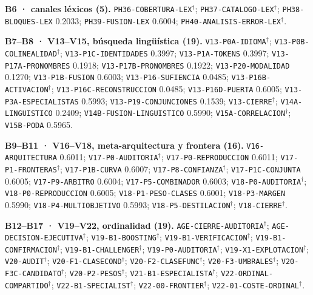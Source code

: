 \documentclass[journal]{IEEEtai}
\begin{document}
\par\medskip\noindent\textbf{B6 · canales l\'exicos (5).} \texttt{PH36-COBERTURA-LEX}$^{\dagger}$; \texttt{PH37-CATALOGO-LEX}$^{\dagger}$; \texttt{PH38-BLOQUES-LEX} 0.2033; \texttt{PH39-FUSION-LEX} 0.6004; \texttt{PH40-ANALISIS-ERROR-LEX}$^{\dagger}$.

\par\medskip\noindent\textbf{B7--B8 · V13--V15, b\'usqueda ling\"u\'istica (19).} \texttt{V13-P0A-IDIOMA}$^{\dagger}$; \texttt{V13-P0B-COLINEALIDAD}$^{\dagger}$; \texttt{V13-P1C-IDENTIDADES} 0.3997; \texttt{V13-P1A-TOKENS} 0.3997; \texttt{V13-P17A-PRONOMBRES} 0.1918; \texttt{V13-P17B-PRONOMBRES} 0.1922; \texttt{V13-P20-MODALIDAD} 0.1270; \texttt{V13-P1B-FUSION} 0.6003; \texttt{V13-P16-SUFIENCIA} 0.0485; \texttt{V13-P16B-ACTIVACION}$^{\dagger}$; \texttt{V13-P16C-RECONSTRUCCION} 0.0485; \texttt{V13-P16D-PUERTA} 0.6005; \texttt{V13-P3A-ESPECIALISTAS} 0.5993; \texttt{V13-P19-CONJUNCIONES} 0.1539; \texttt{V13-CIERRE}$^{\dagger}$; \texttt{V14A-LINGUISTICO} 0.2409; \texttt{V14B-FUSION-LINGUISTICO} 0.5990; \texttt{V15A-CORRELACION}$^{\dagger}$; \texttt{V15B-PODA} 0.5965.

\par\medskip\noindent\textbf{B9--B11 · V16--V18, meta-arquitectura y frontera (16).} \texttt{V16-ARQUITECTURA} 0.6011; \texttt{V17-P0-AUDITORIA}$^{\dagger}$; \texttt{V17-P0-REPRODUCCION} 0.6011; \texttt{V17-P1-FRONTERAS}$^{\dagger}$; \texttt{V17-P1B-CURVA} 0.6007; \texttt{V17-P8-CONFIANZA}$^{\dagger}$; \texttt{V17-P1C-CONJUNTA} 0.6005; \texttt{V17-P9-ARBITRO} 0.6004; \texttt{V17-P5-COMBINADOR} 0.6003; \texttt{V18-P0-AUDITORIA}$^{\dagger}$; \texttt{V18-P0-REPRODUCCION} 0.6005; \texttt{V18-P1-PESO-CLASES} 0.6001; \texttt{V18-P3-MARGEN} 0.5990; \texttt{V18-P4-MULTIOBJETIVO} 0.5993; \texttt{V18-P5-DESTILACION}$^{\dagger}$; \texttt{V18-CIERRE}$^{\dagger}$.

\par\medskip\noindent\textbf{B12--B17 · V19--V22, ordinalidad (19).} \texttt{AGE-CIERRE-AUDITORIA}$^{\dagger}$; \texttt{AGE-DECISION-EJECUTIVA}$^{\dagger}$; \texttt{V19-B1-BOOSTING}$^{\dagger}$; \texttt{V19-B1-VERIFICACION}$^{\dagger}$; \texttt{V19-B1-CONFIRMACION}$^{\dagger}$; \texttt{V19-B1-CHALLENGER}$^{\dagger}$; \texttt{V19-P0-AUDITORIA}$^{\dagger}$; \texttt{V19-X1-EXPLOTACION}$^{\dagger}$; \texttt{V20-AUDIT}$^{\dagger}$; \texttt{V20-F1-CLASECOND}$^{\dagger}$; \texttt{V20-F2-CLASEFUNC}$^{\dagger}$; \texttt{V20-F3-UMBRALES}$^{\dagger}$; \texttt{V20-F3C-CANDIDATO}$^{\dagger}$; \texttt{V20-P2-PESOS}$^{\dagger}$; \texttt{V21-B1-ESPECIALISTA}$^{\dagger}$; \texttt{V22-ORDINAL-COMPARTIDO}$^{\dagger}$; \texttt{V22-B1-SPECIALIST}$^{\dagger}$; \texttt{V22-00-FRONTIER}$^{\dagger}$; \texttt{V22-01-COSTE-ORDINAL}$^{\dagger}$.
\end{document}

